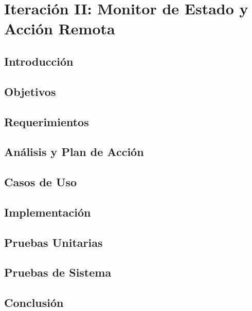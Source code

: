 
\chapter{Iteración II:  Monitor de Estado y Acción Remota} %

\label{Chapter7} %


\section{Introducción}
\section{Objetivos}
\section{Requerimientos}
\section{Análisis y Plan de Acción}
\section{Casos de Uso}
\section{Implementación}
\section{Pruebas Unitarias}
\section{Pruebas de Sistema}
\section{Conclusión}
